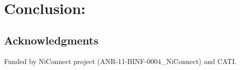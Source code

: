 \documentclass[5p]{elsarticle}
\begin{document}
\section{Conclusion:}









\subsection*{Acknowledgments}

Funded by NiConnect project (ANR-11-BINF-0004\_NiConnect) and CATI.



\small
%



\end{document}
